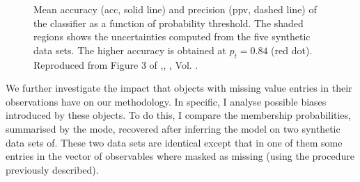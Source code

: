 \begin{figure}[ht!]
\begin{center}
\caption{Mean accuracy (\gls{acc}, solid line) and precision (\gls{ppv}, dashed line) of the classifier as a function of probability threshold. The shaded regions shows the uncertainties computed from the five synthetic data sets. The higher accuracy is obtained at $p_t=0.84$ (red dot). Reproduced from Figure 3 of \citet{Olivares2017},\textit{}, , Vol. .}
\label{fig:ACC}
\end{center}
\end{figure}

We further investigate the impact that objects with missing value entries in their observations have on our methodology. In specific, I analyse possible biases introduced by these objects. To do this, I compare the membership probabilities, summarised by the mode, recovered after inferring the model on two synthetic data sets of. These two data sets are identical except that in one of them some entries in the vector of observables where masked as missing (using the procedure previously described).

